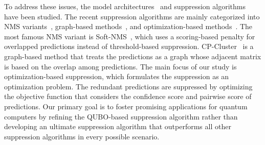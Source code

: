 To address these issues, the model architectures~\cite{Chen2022DATE,YOLOV10,Lv2024detr} and suppression algorithms~\cite{bodla2017snms,ShenJXLK22CPCluster,shepley2023confluence} have been studied.
The recent suppression algorithms are mainly categorized into NMS variants~\cite{bodla2017snms,zhou2017cad,Liu2019AdaNMS,He2019SofterNMS,Nils2020vgnms,Huang2020VFGNMS,solovyev2021weighted,shepley2023confluence}, graph-based methods~\cite{ShenJXLK22CPCluster}, and optimization-based methods~\cite{rujikietgumjorn2013qubo,lee2016individual,li2020qsqs}.
The most famous NMS variant is Soft-NMS~\cite{bodla2017snms}, which uses a scoring-based penalty for overlapped predictions instead of threshold-based suppression.
CP-Cluster~\cite{ShenJXLK22CPCluster} is a graph-based method that treats the predictions as a graph whose adjacent matrix is based on the overlap among predictions. 
The main focus of our study is optimization-based suppression, which formulates the suppression as an optimization problem. The redundant predictions are suppressed by optimizing the objective function that considers the confidence score and pairwise score of predictions.
Our primary goal is to foster promising applications for quantum computers by refining the QUBO-based suppression algorithm rather than developing an ultimate suppression algorithm that outperforms all other suppression algorithms in every possible scenario.

